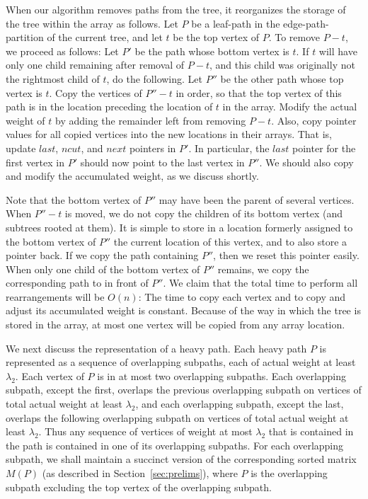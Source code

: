 When our algorithm removes paths from the tree, it reorganizes the storage of the tree within the array as follows. 
Let $P$ be a leaf-path in the edge-path-partition of the current tree, and let $t$ be the top vertex of $P$. 
To remove $P-t$, we proceed as follows: 
Let $P'$ be the path whose bottom vertex is $t$. 
If $t$ will have only one child remaining after removal of $P-t$, and this child was originally not the rightmost child of $t$, do the following. 
Let $P''$ be the other path whose top vertex is $t$. 
Copy the vertices of $P''-t$ in order, so that the top vertex of this path is in the location preceding the location of $t$ in the array. 
Modify the actual weight of $t$ by adding the remainder left from removing $P-t$. 
Also, copy pointer values for all copied vertices into the new locations in their arrays. 
That is, update $last$, $ncut$, and $next$ pointers in $P'$. 
In particular, the $last$ pointer for the first vertex in $P'$ should now point to the last vertex in $P''$. 
We should also copy and modify the accumulated weight, as we discuss shortly.

Note that the bottom vertex of $P''$ may have been the parent of several vertices. 
When $P''-t$ is moved, we do not copy the children of its bottom vertex (and subtrees rooted at them). 
It is simple to store in a location formerly assigned to the bottom vertex of $P''$ the current location of this vertex, and to also store a pointer back. 
If we copy the path containing $P''$, then we reset this pointer easily. 
When only one child of the bottom vertex of $P''$ remains, we copy the corresponding path to in front of $P''$. 
We claim that the total time to perform all rearrangements will be $O(n)$: 
The time to copy each vertex and to copy and adjust its accumulated weight is constant. 
Because of the way in which the tree is stored in the array, at most one vertex will be copied from any array location.

We next discuss the representation of a heavy path. 
Each heavy path $P$ is represented as a sequence of overlapping subpaths, each of actual weight at least $\lambda_2$. 
Each vertex of $P$ is in at most two overlapping subpaths. 
Each overlapping subpath, except the first, overlaps the previous overlapping subpath on vertices of total actual weight at least $\lambda_2$, and each overlapping subpath, except the last, overlaps the following overlapping subpath on vertices of total actual weight at least $\lambda_2$. 
Thus any sequence of vertices of weight at most $\lambda_2$ that is contained in the path is contained in one of its overlapping subpaths. 
For each overlapping subpath, we shall maintain a succinct version of the corresponding sorted matrix $M(P)$ (as described in Section~\ref{sec:prelims}), where $P$ is the overlapping subpath excluding the top vertex of the overlapping subpath.

